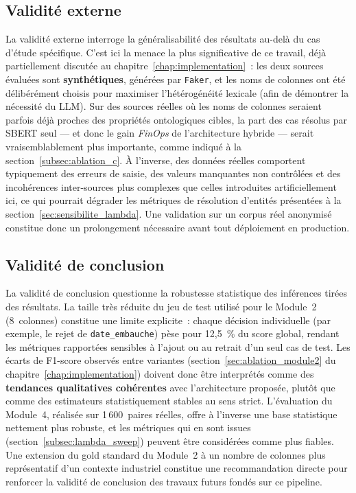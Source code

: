 \subsection{Validité externe}

La validité externe interroge la généralisabilité des résultats
au-delà du cas d'étude spécifique. C'est ici la menace la plus
significative de ce travail, déjà partiellement discutée au
chapitre~\ref{chap:implementation}~: les deux sources évaluées sont
\textbf{synthétiques}, générées par \texttt{Faker}, et les noms de
colonnes ont été délibérément choisis pour maximiser l'hétérogénéité
lexicale (afin de démontrer la nécessité du LLM). Sur des sources
réelles où les noms de colonnes seraient parfois déjà proches des
propriétés ontologiques cibles, la part des cas résolus par SBERT
seul --- et donc le gain \textit{FinOps} de l'architecture hybride ---
serait vraisemblablement plus importante, comme indiqué à la
section~\ref{subsec:ablation_c}. À l'inverse, des données réelles
comportent typiquement des erreurs de saisie, des valeurs manquantes
non contrôlées et des incohérences inter-sources plus complexes que
celles introduites artificiellement ici, ce qui pourrait dégrader les
métriques de résolution d'entités présentées à la
section~\ref{sec:sensibilite_lambda}. Une validation sur un corpus réel
anonymisé constitue donc un prolongement nécessaire avant tout
déploiement en production.

\subsection{Validité de conclusion}

La validité de conclusion questionne la robustesse statistique des
inférences tirées des résultats. La taille très réduite du jeu de test
utilisé pour le Module~2 (8~colonnes) constitue une limite
explicite~: chaque décision individuelle (par exemple, le rejet de
\texttt{date\_embauche}) pèse pour 12,5~\% du score global, rendant les
métriques rapportées sensibles à l'ajout ou au retrait d'un seul cas de
test. Les écarts de F1-score observés entre variantes
(section~\ref{sec:ablation_module2} du chapitre~\ref{chap:implementation})
doivent donc être interprétés comme des \textbf{tendances qualitatives
cohérentes} avec l'architecture proposée, plutôt que comme des
estimateurs statistiquement stables au sens strict. L'évaluation du
Module~4, réalisée sur 1\,600~paires réelles, offre à l'inverse une base
statistique nettement plus robuste, et les métriques qui en sont issues
(section~\ref{subsec:lambda_sweep}) peuvent être considérées comme plus
fiables. Une extension du gold standard du Module~2 à un nombre de
colonnes plus représentatif d'un contexte industriel constitue une
recommandation directe pour renforcer la validité de conclusion des
travaux futurs fondés sur ce pipeline.

